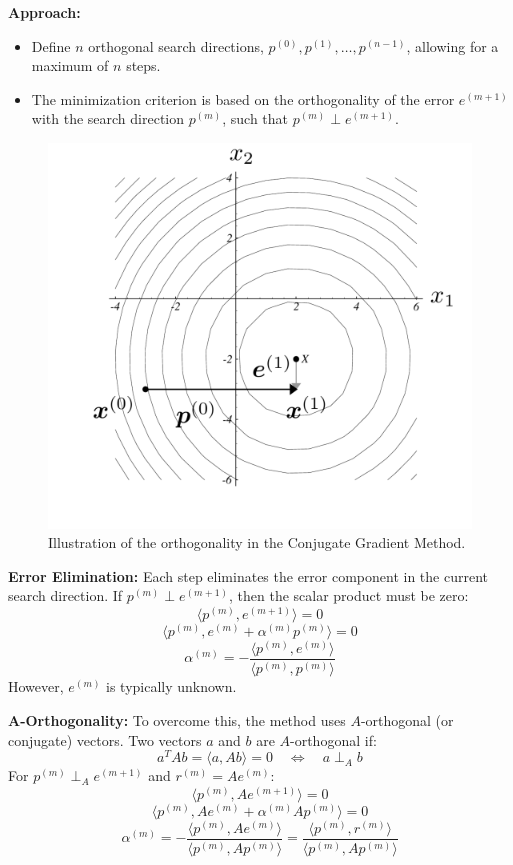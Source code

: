\documentclass[unicode,11pt,a4paper,oneside,numbers=endperiod,openany]{scrartcl}
\begin{document}
\textbf{Approach:}
\begin{itemize}
    \item Define \( n \) orthogonal search directions, \( p^{(0)}, p^{(1)}, \ldots, p^{(n-1)} \), allowing for a maximum of \( n \) steps.
    \item The minimization criterion is based on the orthogonality of the error \( e^{(m+1)} \) with the search direction \( p^{(m)} \), such that \( p^{(m)} \perp e^{(m+1)} \).
\end{itemize}
\begin{figure}[H]
    \centering
    \includegraphics[trim=0cm 0cm 0cm 0cm, clip, width=10   cm]{img8.png}
    \caption{Illustration of the orthogonality in the Conjugate Gradient Method.}
    \label{fig:img8}
\end{figure}

\textbf{Error Elimination:}
Each step eliminates the error component in the current search direction. If \( p^{(m)} \perp e^{(m+1)} \), then the scalar product must be zero:
\[
\langle p^{(m)}, e^{(m+1)} \rangle = 0
\]
\[
\langle p^{(m)}, e^{(m)} + \alpha^{(m)} p^{(m)} \rangle = 0
\]
\[
\alpha^{(m)} = -\frac{\langle p^{(m)}, e^{(m)} \rangle}{\langle p^{(m)}, p^{(m)} \rangle}
\]
However, \( e^{(m)} \) is typically unknown.

\textbf{A-Orthogonality:}
To overcome this, the method uses \( A \)-orthogonal (or conjugate) vectors. Two vectors \( a \) and \( b \) are \( A \)-orthogonal if:
\[
a^T A b = \langle a, Ab \rangle = 0 \quad \Leftrightarrow \quad a \perp_A b
\]
For \( p^{(m)} \perp_A e^{(m+1)} \) and \( r^{(m)} = Ae^{(m)} \):
\[
\langle p^{(m)}, Ae^{(m+1)} \rangle = 0
\]
\[
\langle p^{(m)}, Ae^{(m)} + \alpha^{(m)} Ap^{(m)} \rangle = 0
\]
\[
\alpha^{(m)} = -\frac{\langle p^{(m)}, Ae^{(m)} \rangle}{\langle p^{(m)}, Ap^{(m)} \rangle} = \frac{\langle p^{(m)}, r^{(m)} \rangle}{\langle p^{(m)}, Ap^{(m)} \rangle}
\]
\end{document}
